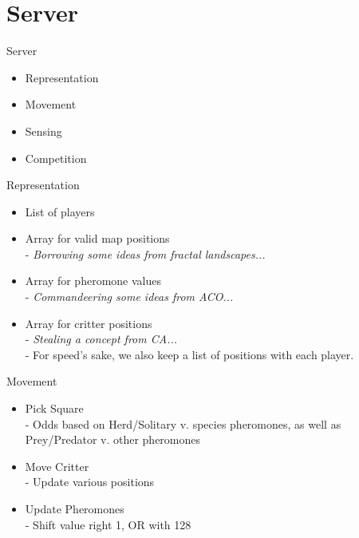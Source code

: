 \documentclass[11pt]{beamer}
\begin{document}
\section{Server}
\begin{frame}{Server}
\begin{itemize}
    \item Representation
	\item Movement
	\item Sensing
	\item Competition
\end{itemize}
\end{frame}

\begin{frame}{Representation}
\begin{itemize}
    \item List of players
    \pause
    \item Array for valid map positions
        \\ - \textit{Borrowing some ideas from fractal landscapes...}
    \pause
    \item Array for pheromone values
        \\ - \textit{Commandeering some ideas from ACO...}
    \pause
    \item Array for critter positions
        \\ - \textit{Stealing a concept from CA...}
        \\ - For speed's sake, we also keep a list of positions with each player.
\end{itemize}
\end{frame}

\begin{frame}{Movement}
\begin{itemize}
    \item Pick Square
        \\ - Odds based on Herd/Solitary v. species pheromones, as well as Prey/Predator v. other pheromones
    \pause
    \item Move Critter
        \\ - Update various positions
    \pause
    \item Update Pheromones
        \\ - Shift value right 1, OR with 128
\end{itemize}
\end{frame}
\end{document}
